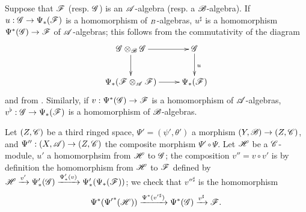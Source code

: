 \begin{env}[4.4.7]
\label{0.4.4.7}
Suppose that $\mathscr{F}$ (resp. $\mathscr{G}$) is an $\mathscr{A}$-algebra (resp. a $\mathscr{B}$-algebra). If
$u:\mathscr{G}\to\Psi_*(\mathscr{F})$ is a homomorphism of $\sb{B}$-algebras, $u^\sharp$ is a
homomorphism $\Psi^*(\mathscr{G})\to\mathscr{F}$ of $\mathscr{A}$-algebras; this follows from the
commutativity of the diagram
\[
  \xymatrix{
    \sh{G}\otimes_\sh{B}\sh{G}\ar[r]\ar[d] &
    \sh{G}\ar[d]^u\\
    \Psi_*(\sh{F}\otimes_\sh{A}\sh{F})\ar[r] &
    \Psi_*(\sh{F})
  }
\]
and from . Similarly, if $v:\Psi^*(\mathscr{G})\to\mathscr{F}$ is a homomorphism of
$\mathscr{A}$-algebras, $v^\flat:\mathscr{G}\to\Psi_*(\mathscr{F})$ is a homomorphism of $\mathscr{B}$-algebras.
\end{env}

\begin{env}[4.4.8]
\label{0.4.4.8}
Let $(Z,\mathscr{C})$ be a third ringed space, $\Psi'=(\psi',\theta')$ a morphism
$(Y,\mathscr{B})\to(Z,\mathscr{C})$, and $\Psi'':(X,\mathscr{A})\to(Z,\mathscr{C})$ the composite morphism
$\Psi'\circ\Psi$. Let $\mathscr{H}$ be a $\mathscr{C}$-module, $u'$ a homomorphsim from $\mathscr{H}$ to
$\mathscr{G}$; the composition $v''=v\circ v'$ is by definition the homomorphism from $\mathscr{H}$ to
$\mathscr{F}$ defined by
$\mathscr{H}\xrightarrow{v'}\Psi_*'(\mathscr{G})\xrightarrow{\Psi_*'(v)}\Psi_*'(\Psi_*(\mathscr{F}))$; we
check that ${v''}^\sharp$ is the homomorphism
\[
  \Psi^*({\Psi'}^*(\mathscr{H}))\xrightarrow{\Psi^*({v'}^\sharp)}\Psi^*(\mathscr{G})
  \xrightarrow{v^\sharp}\mathscr{F}.
\]
\end{env}

